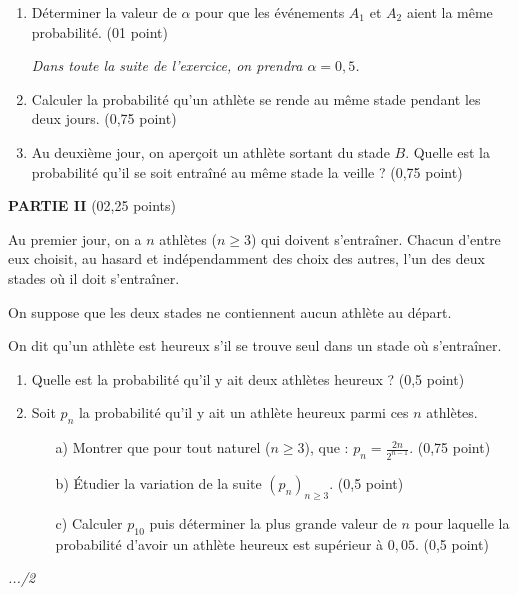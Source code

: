 \documentclass[11pt]{article}
\begin{document}
\begin{enumerate}
    \item Déterminer la valeur de \( \alpha \) pour que les événements \( A_1 \) et \( A_2 \) aient la même probabilité. \hfill (01 point)

    \noindent \textit{Dans toute la suite de l’exercice, on prendra \( \alpha = 0{,}5 \).}

    \item Calculer la probabilité qu’un athlète se rende au même stade pendant les deux jours. \hfill (0,75 point)

    \item Au deuxième jour, on aperçoit un athlète sortant du stade \( B \). Quelle est la probabilité qu’il se soit entraîné au même stade la veille ? \hfill (0,75 point)
\end{enumerate}

\vspace{0.4cm}
\noindent
\textbf{PARTIE II} \hfill (02,25 points)

\vspace{0.2cm}
\noindent
Au premier jour, on a \( n \) athlètes (\( n \geq 3 \)) qui doivent s’entraîner. Chacun d’entre eux choisit, au hasard et indépendamment des choix des autres, l’un des deux stades où il doit s’entraîner.

\noindent
On suppose que les deux stades ne contiennent aucun athlète au départ.

\noindent
On dit qu’un athlète est heureux s’il se trouve seul dans un stade où s’entraîner.

\begin{enumerate}
    \item Quelle est la probabilité qu’il y ait deux athlètes heureux ? \hfill (0,5 point)

    \item Soit \( p_n \) la probabilité qu’il y ait un athlète heureux parmi ces \( n \) athlètes.
    \begin{enumerate}
        \item[a)] Montrer que pour tout naturel (\( n \geq 3 \)), que : \( p_n = \frac{2n}{2^{n-1}} \). \hfill (0,75 point)
        \item[b)] Étudier la variation de la suite \( (p_n)_{n \geq 3} \). \hfill (0,5 point)
        \item[c)] Calculer \( p_{10} \) puis déterminer la plus grande valeur de \( n \) pour laquelle la probabilité d’avoir un athlète heureux est supérieur à \( 0{,}05 \). \hfill (0,5 point)
    \end{enumerate}
\end{enumerate}

\vfill
\begin{flushright}
    \textit{.../2}
\end{flushright}
\end{document}
